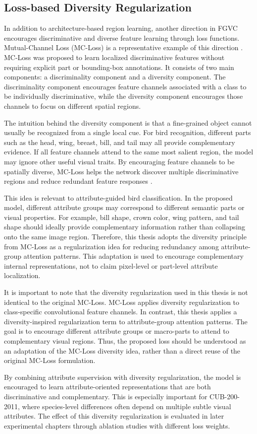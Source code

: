 \subsection{Loss-based Diversity Regularization}

In addition to architecture-based region learning, another direction in FGVC encourages discriminative and diverse feature learning through loss functions. Mutual-Channel Loss (MC-Loss) is a representative example of this direction \cite{Chang_2020}. MC-Loss was proposed to learn localized discriminative features without requiring explicit part or bounding-box annotations. It consists of two main components: a discriminality component and a diversity component. The discriminality component encourages feature channels associated with a class to be individually discriminative, while the diversity component encourages those channels to focus on different spatial regions.

The intuition behind the diversity component is that a fine-grained object cannot usually be recognized from a single local cue. For bird recognition, different parts such as the head, wing, breast, bill, and tail may all provide complementary evidence. If all feature channels attend to the same most salient region, the model may ignore other useful visual traits. By encouraging feature channels to be spatially diverse, MC-Loss helps the network discover multiple discriminative regions and reduce redundant feature responses \cite{Chang_2020}.

This idea is relevant to attribute-guided bird classification. In the proposed model, different attribute groups may correspond to different semantic parts or visual properties. For example, bill shape, crown color, wing pattern, and tail shape should ideally provide complementary information rather than collapsing onto the same image region. Therefore, this thesis adopts the diversity principle from MC-Loss as a regularization idea for reducing redundancy among attribute-group attention patterns. This adaptation is used to encourage complementary internal representations, not to claim pixel-level or part-level attribute localization.

It is important to note that the diversity regularization used in this thesis is not identical to the original MC-Loss. MC-Loss applies diversity regularization to class-specific convolutional feature channels. In contrast, this thesis applies a diversity-inspired regularization term to attribute-group attention patterns. The goal is to encourage different attribute groups or macro-parts to attend to complementary visual regions. Thus, the proposed loss should be understood as an adaptation of the MC-Loss diversity idea, rather than a direct reuse of the original MC-Loss formulation.

By combining attribute supervision with diversity regularization, the model is encouraged to learn attribute-oriented representations that are both discriminative and complementary. This is especially important for CUB-200-2011, where species-level differences often depend on multiple subtle visual attributes. The effect of this diversity regularization is evaluated in later experimental chapters through ablation studies with different loss weights.